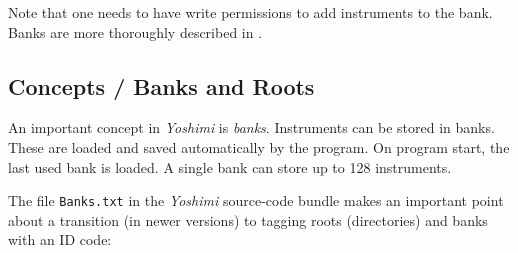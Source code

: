    Note that one needs to have write permissions to add instruments to the
   bank.
   Banks are more thoroughly described in
   .

\subsection{Concepts / Banks and Roots}
\label{subsec:concepts_banks_and_roots}

   An important concept in \textsl{Yoshimi} is \textsl{banks}.  Instruments
   can be stored in banks. These are loaded and saved automatically by the
   program.  On program start, the last used bank is loaded. A single bank
   can store up to 128 instruments. 

   The file \texttt{Banks.txt} in the \textsl{Yoshimi} source-code bundle
   makes an important point about a transition (in newer versions)
   to tagging roots (directories) and banks with an ID code:

